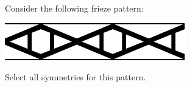 \documentclass{ximera}
\author{Bart Snapp}
\begin{document}
\begin{exercise}
  Consider the following frieze pattern:
  \begin{image}
  \includegraphics{fph7.pdf}
  \end{image}
  Select all symmetries for this pattern.
  \begin{selectAll}
  \end{selectAll}
\end{exercise}
\end{document}
